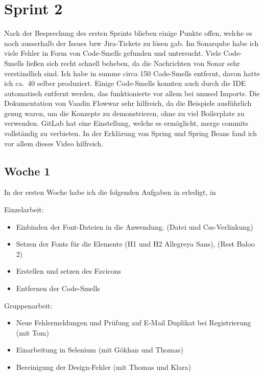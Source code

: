 

\section{Sprint 2}\label{sec:sprint2}
Nach der Besprechung des ersten Sprints blieben einige Punkte offen, welche es noch ausserhalb der Issues bzw Jira-Tickets zu lösen gab.
Im Sonarqube habe ich viele Fehler in Form von Code-Smells gefunden und untersucht.
Viele Code-Smells ließen sich recht schnell beheben, da die Nachrichten von Sonar sehr verständlich sind.
Ich habe in summe circa 150 Code-Smells entfernt, davon hatte ich ca.\ 40 selber produziert.
Einige Code-Smells konnten auch durch die IDE automatisch entfernt werden, das funktionierte vor allem bei unused Imports.
Die Dokumentation von Vaadin Flow\cite*[]{flowdocumentation}war sehr hilfreich, da die Beispiele ausführlich genug waren,
um die Konzepte zu demonstrieren, ohne zu viel Boilerplate zu verwenden.
GitLab hat eine Einstellung, welche es ermöglicht, merge commits vollständig zu verbieten.
In der Erklärung von Spring und Spring Beans fand ich vor allem dieses Video\cite*[]{springvideo} hilfreich.

\subsection{Woche 1}\label{subsec:s2w1}
In der ersten Woche habe ich die folgenden Aufgaben in erledigt, in

Einzelarbeit:
\begin{itemize}
    \item Einbinden der Font-Dateien in die Anwendung. (Datei und Css-Verlinkung)
    \item Setzen der Fonts für die Elemente (H1 und H2 Allegreya Sans), (Rest Baloo 2)
    \item Erstellen und setzen des Favicons
    \item Entfernen der Code-Smells

\end{itemize}

Gruppenarbeit:

\begin{itemize}
    \item Neue Fehlermeldungen und Prüfung auf E-Mail Duplikat bei Registrierung (mit Tom)
    \item Einarbeitung in Selenium (mit Gökhan und Thomas)
    \item Bereinigung der Design-Fehler (mit Thomas und Klara)
\end{itemize}

